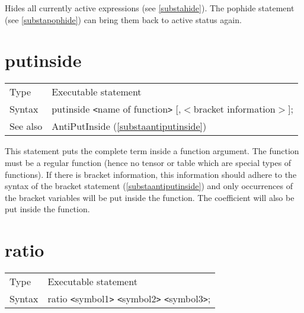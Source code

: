 \noindent Hides all currently active 
expressions (see \ref{substahide}). The pophide statement 
(see \ref{substapophide}) can bring them back to active status again. 
\vspace{10mm}


\section{putinside}
\label{substaputinside}

\noindent \begin{tabular}{ll}
Type & Executable statement\\
Syntax & putinside {\tt<}name of function{\tt>} [,$<$bracket information$>$];
\\ See also & AntiPutInside (\ref{substaantiputinside})
\end{tabular}\vspace{4mm}

\noindent This statement puts the complete term inside a 
function argument. The function must be a regular function (hence no tensor 
or table which are special types of functions). If there is 
bracket information, this information should adhere to the 
syntax of the bracket statement (\ref{substaantiputinside}) and only 
occurrences of the bracket variables will be put inside the function. The 
coefficient will also be put inside the function.
\vspace{10mm}

 
\section{ratio}
\label{substaratio}

\noindent \begin{tabular}{ll}
Type & Executable statement\\
Syntax & ratio {\tt<}symbol1{\tt>} {\tt<}symbol2{\tt>} {\tt<}symbol3{\tt>};
\end{tabular} \vspace{4mm}

